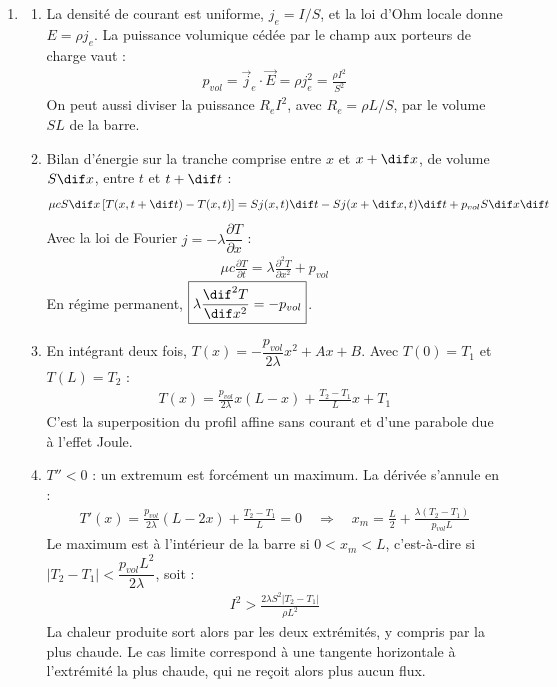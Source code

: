 \newpage

\begin{correction}

\begin{enumerate}

\item

\begin{enumerate}

	\item La densité de courant est uniforme, $j_e=I/S$, et la loi d'Ohm locale donne $E=\rho j_e$. La puissance volumique cédée par le champ aux porteurs de charge vaut :
	\begin{align*}
		p_{vol}=\vec{j}_e\cdot\vec{E}=\rho j_e^2=\frac{\rho I^2}{S^2}
	\end{align*}
	On peut aussi diviser la puissance $R_eI^2$, avec $R_e=\rho L/S$, par le volume $SL$ de la barre.

	\item Bilan d'énergie sur la tranche comprise entre $x$ et $x+\dif x$, de volume $S\dif x$, entre $t$ et $t+\dif t$ :
	\begin{align*}
		\mu cS\dif x\left[T(x,t+\dif t)-T(x,t)\right]=Sj(x,t)\dif t-Sj(x+\dif x,t)\dif t+p_{vol}S\dif x\dif t
	\end{align*}
	Avec la loi de Fourier $j=-\lambda\dfrac{\partial T}{\partial x}$ :
	\begin{align*}
		\mu c\frac{\partial T}{\partial t}=\lambda\frac{\partial^2 T}{\partial x^2}+p_{vol}
	\end{align*}
	En régime permanent, $\boxed{\lambda\dfrac{\dif^2 T}{\dif x^2}=-p_{vol}}$.

	\item En intégrant deux fois, $T(x)=-\dfrac{p_{vol}}{2\lambda}x^2+Ax+B$. Avec $T(0)=T_1$ et $T(L)=T_2$ :
	\begin{align*}
		\boxed{T(x) = \frac{p_{vol}}{2\lambda}x(L-x)+\frac{T_2-T_1}{L}x+T_1}
	\end{align*}
	C'est la superposition du profil affine sans courant et d'une parabole due à l'effet Joule.

	\item $T''<0$ : un extremum est forcément un maximum. La dérivée s'annule en :
	\begin{align*}
		T'(x)=\frac{p_{vol}}{2\lambda}(L-2x)+\frac{T_2-T_1}{L}=0 \quad\Rightarrow\quad x_m=\frac{L}{2}+\frac{\lambda(T_2-T_1)}{p_{vol}L}
	\end{align*}
	Le maximum est à l'intérieur de la barre si $0<x_m<L$, c'est-à-dire si $|T_2-T_1|<\dfrac{p_{vol}L^2}{2\lambda}$, soit :
	\begin{align*}
		\boxed{I^2>\frac{2\lambda S^2|T_2-T_1|}{\rho L^2}}
	\end{align*}
	La chaleur produite sort alors par les deux extrémités, y compris par la plus chaude. Le cas limite correspond à une tangente horizontale à l'extrémité la plus chaude, qui ne reçoit alors plus aucun flux.


\end{enumerate}
\end{enumerate}
\end{correction}
